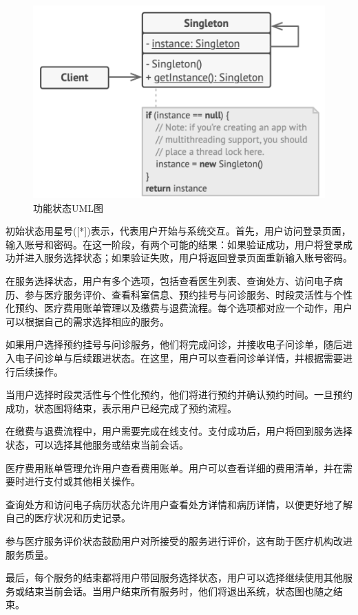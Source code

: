 \begin{figure}[htbp]
	\centering
	\includegraphics[width=\textwidth]{figures/05.png}
	\caption{功能状态UML图}
	\label{fig:functional_state_diagram}
\end{figure}

初始状态用星号([*])表示，代表用户开始与系统交互。首先，用户访问登录页面，输入账号和密码。在这一阶段，有两个可能的结果：如果验证成功，用户将登录成功并进入服务选择状态；如果验证失败，用户将返回登录页面重新输入账号密码。

在服务选择状态，用户有多个选项，包括查看医生列表、查询处方、访问电子病历、参与医疗服务评价、查看科室信息、预约挂号与问诊服务、时段灵活性与个性化预约、医疗费用账单管理以及缴费与退费流程。每个选项都对应一个动作，用户可以根据自己的需求选择相应的服务。

如果用户选择预约挂号与问诊服务，他们将完成问诊，并接收电子问诊单，随后进入电子问诊单与后续跟进状态。在这里，用户可以查看问诊单详情，并根据需要进行后续操作。

当用户选择时段灵活性与个性化预约，他们将进行预约并确认预约时间。一旦预约成功，状态图将结束，表示用户已经完成了预约流程。

在缴费与退费流程中，用户需要完成在线支付。支付成功后，用户将回到服务选择状态，可以选择其他服务或结束当前会话。

医疗费用账单管理允许用户查看费用账单。用户可以查看详细的费用清单，并在需要时进行支付或其他相关操作。

查询处方和访问电子病历状态允许用户查看处方详情和病历详情，以便更好地了解自己的医疗状况和历史记录。

参与医疗服务评价状态鼓励用户对所接受的服务进行评价，这有助于医疗机构改进服务质量。

最后，每个服务的结束都将用户带回服务选择状态，用户可以选择继续使用其他服务或结束当前会话。当用户结束所有服务时，他们将退出系统，状态图也随之结束。



